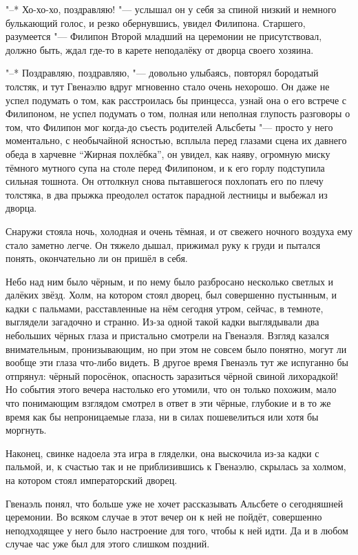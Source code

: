 "--* Хо-хо-хо, поздравляю! "--- услышал он у себя за спиной низкий и немного
булькающий голос, и резко обернувшись, увидел Филипона.
Старшего, разумеется "--- Филипон Второй младший на церемонии не присутствовал,
должно быть, ждал где-то в карете неподалёку от дворца своего хозяина.

"--* Поздравляю, поздравляю, "--- довольно улыбаясь, повторял бородатый толстяк,
и тут Гвенаэлю вдруг мгновенно стало очень нехорошо.
Он даже не успел подумать о том, как расстроилась бы принцесса, узнай она о его
встрече с Филипоном, не успел подумать о том, полная или неполная глупость
разговоры о том, что Филипон мог когда-до съесть родителей Альсбеты "--- просто
у него моментально, с необычайной ясностью, всплыла перед глазами сцена их
давнего обеда в харчевне \enquote{Жирная похлёбка}, он увидел, как наяву,
огромную миску тёмного мутного супа на столе перед Филипоном, и к его горлу
подступила сильная тошнота.
Он оттолкнул снова пытавшегося похлопать его по плечу толстяка, в два прыжка
преодолел остаток парадной лестницы и выбежал из дворца.

Снаружи стояла ночь, холодная и очень тёмная, и от свежего ночного воздуха ему
стало заметно легче.
Он тяжело дышал, прижимал руку к груди и пытался понять, окончательно ли он
пришёл в себя.

Небо над ним было чёрным, и по нему было разбросано несколько светлых и далёких
звёзд.
Холм, на котором стоял дворец, был совершенно пустынным, и кадки с пальмами,
расставленные на нём сегодня утром, сейчас, в темноте, выглядели загадочно и
странно.
Из-за одной такой кадки выглядывали два небольших чёрных глаза и пристально
смотрели на Гвенаэля.
Взгляд казался внимательным, пронизывающим, но при этом не совсем было понятно,
могут ли вообще эти глаза что-либо видеть.
В другое время Гвенаэль тут же испуганно бы отпрянул: чёрный поросёнок,
опасность заразиться чёрной свиной лихорадкой!
Но события этого вечера настолько его утомили, что он только похожим, мало что
понимающим взглядом смотрел в ответ в эти чёрные, глубокие и в то же время как
бы непроницаемые глаза, ни в силах пошевелиться или хотя бы моргнуть.

Наконец, свинке надоела эта игра в гляделки, она выскочила из-за кадки с
пальмой, и, к счастью так и не приблизившись к Гвенаэлю, скрылась за холмом, на
котором стоял императорский дворец.

Гвенаэль понял, что больше уже не хочет рассказывать Альсбете о сегодняшней
церемонии.
Во всяком случае в этот вечер он к ней не пойдёт, совершенно неподходящее у него
было настроение для того, чтобы к ней идти.
Да и в любом случае час уже был для этого слишком поздний.
